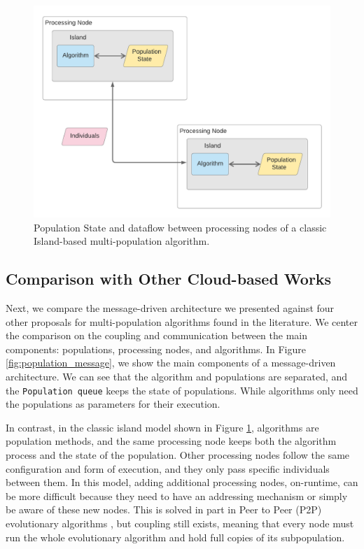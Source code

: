 \documentclass[review]{elsarticle}
\begin{document}
\begin{figure}[ht]
    \centering
    \includegraphics[width=\textwidth]{classicisland}
    \caption{ Population State and dataflow between processing nodes of a classic Island-based multi-population algorithm. }
    \label{fig:classicisland}
\end{figure}

\subsection{Comparison with Other Cloud-based Works} 
\label{comparison}

Next, we compare the message-driven architecture we presented against four other
proposals for multi-population algorithms found in the literature. We center the
comparison on the coupling and communication between the main components:
populations, processing nodes, and algorithms.  In Figure \ref{fig:population_message}, we show the
main components of a message-driven architecture. We can see that the algorithm
and populations are separated, and the \texttt{Population queue} keeps the state
of populations. While algorithms only need the populations as parameters
for their execution.


In contrast, in the classic island model shown in Figure
\ref{fig:classicisland}, algorithms are  population methods, and the same processing
node keeps both the algorithm process and the state of the population.  Other
processing nodes follow the same configuration and form of execution, and they
only pass specific individuals between them.  In this model, adding additional
processing nodes, on-runtime, can be more difficult because they need to have
an addressing mechanism or simply be aware of these new nodes. This is
solved in part in Peer to Peer (P2P) evolutionary algorithms
\cite{juanlu:europar}, but coupling still exists, meaning that every
node must run the whole evolutionary algorithm and hold full copies of
its subpopulation. 
\end{document}
